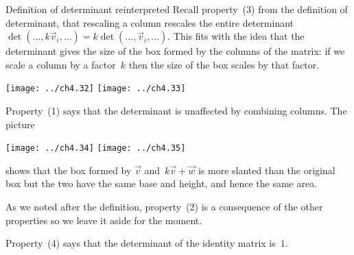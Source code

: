 \documentclass[10pt,t]{beamer}
\begin{document}
\begin{frame}{Definition of determinant reinterpreted}
Recall property~(3) from the definition of determinant,
that rescaling a column rescales the entire determinant
$\det(\ldots,k\vec{v}_i,\ldots)=k\det(\ldots,\vec{v}_i,\ldots)$.
This fits with the idea that the determinant
gives the size of the box formed by the columns of the matrix:
if we scale a column by a factor~$k$ then the size of the box
scales by that factor. 
\begin{center}
  \texttt{[image: ../ch4.32]}
  \qquad
  \texttt{[image: ../ch4.33]}
\end{center}

\pause
Property~(1) says that the determinant is unaffected by 
combining columns.
The picture 
\begin{center}
  \texttt{[image: ../ch4.34]}
  \quad
  \texttt{[image: ../ch4.35]}
\end{center}   
shows that the box
formed by $\vec{v}$ and~$k\vec{v}+\vec{w}$ 
is more slanted than the original box but the two have
the same base and height, and hence the same area.
\end{frame}
\begin{frame}
As we noted after the definition, property~(2) is a consequence of the 
other properties so we leave it aside for the moment.  

Property~(4) says that the determinant of the identity matrix is~$1$.
\end{frame}
\end{document}
